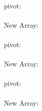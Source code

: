 {{        \\
        pivot: \underline{\hspace{25px}}\\
        \\
        New Array: \underline{\hspace{12cm}}\\
        \\
        pivot: \underline{\hspace{25px}}\\
        \\
        New Array: \underline{\hspace{12cm}}\\
        \\
        pivot: \underline{\hspace{25px}}\\
        \\
        New Array: \underline{\hspace{12cm}}\\
    }
}
